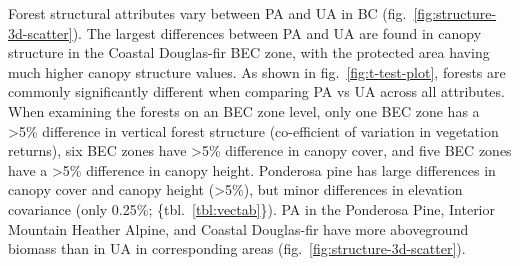 \documentclass[11pt]{article}
\begin{document}
Forest structural attributes vary between PA and UA in BC
(fig.~\ref{fig:structure-3d-scatter}). The largest differences between
PA and UA are found in canopy structure in the Coastal Douglas-fir BEC
zone, with the protected area having much higher canopy structure
values. As shown in fig.~\ref{fig:t-test-plot}, forests are commonly
significantly different when comparing PA vs UA across all attributes.
When examining the forests on an BEC zone level, only one BEC zone has a
\textgreater5\% difference in vertical forest structure (co-efficient of
variation in vegetation returns), six BEC zones have \textgreater5\%
difference in canopy cover, and five BEC zones have a \textgreater5\%
difference in canopy height. Ponderosa pine has large differences in
canopy cover and canopy height (\textgreater5\%), but minor differences
in elevation covariance (only 0.25\%; \{tbl.~\ref{tbl:vectab}\}). PA in
the Ponderosa Pine, Interior Mountain Heather Alpine, and Coastal
Douglas-fir have more aboveground biomass than in UA in corresponding
areas (fig.~\ref{fig:structure-3d-scatter}).
\end{document}
